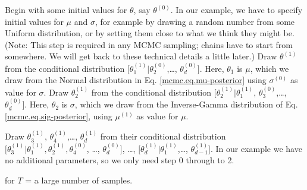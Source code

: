 { Begin with some initial values for $\theta$, say $\theta^{(0)}$.}
In our example, we have to specify initial values for $\mu$ and $\sigma$, for
example by drawing a random number from some Uniform distribution, or
by setting them close to what we think they might be. (Note: This step
is required in any MCMC sampling; chains have to start from
somewhere. We will get back to these technical details a little
later.)
{ Draw $\theta^{(1)}$ from the conditional distribution $[\theta_{1}^{(1)}|\theta_{2}^{(0)}$,\ldots, $\theta_{d}^{(0)}]$. }
Here, $\theta_1$ is $\mu$, which we draw from the Normal distribution in Eq. \ref{mcmc.eq.mu-posterior}  using $\sigma^{(0)}$ as value for $\sigma$.
{ Draw $\theta_{2}^{(1)}$ from the conditional distribution $[\theta_{2}^{(1)}|\theta_{1}^{(1)}$, $\theta_{3}^{(0)}$,\ldots, $\theta_{d}^{(0)}]$. }
Here, $\theta_2$ is $\sigma$, which we draw from the Inverse-Gamma
distribution of Eq. \ref{mcmc.eq.sig-posterior}, using $\mu^{(1)}$ as value for $\mu$.

{ Draw $\theta_{3}^{(1)}$, $\theta_{4}^{(1)}$,\ldots, $\theta_{d}^{(1)}$ from their conditional distribution $[\theta_{3}^{(1)}|\theta_{1}^{(1)}, \theta_{2}^{(1)}, \theta_{4}^{(0)}$, \ldots, $\theta_{d}^{(0)}]$, \ldots, $[\theta_{d}^{(1)}|\theta_{1}^{(1)}$,\ldots, $\theta_{d-1}^{(1)}]$. }
In our example we have no additional parameters, so we only need step 0 through to 2.

{ for $T$ = a large number of samples.}


